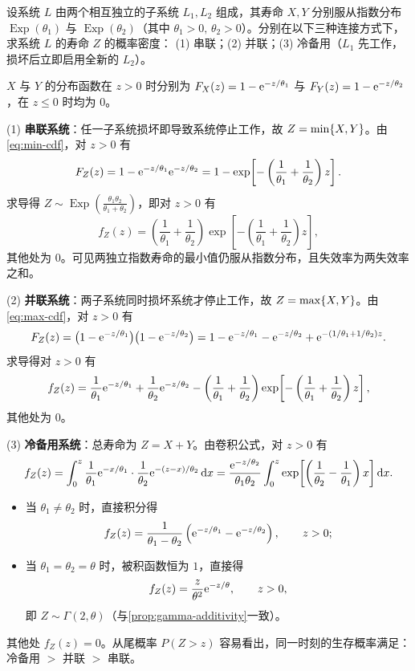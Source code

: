 \begin{example}[title={串联、并联与冷备用三种系统的寿命分布}]
\label{eg:three-lifetime-systems}
设系统 $L$ 由两个相互独立的子系统 $L_1,L_2$ 组成，其寿命 $X,Y$ 分别服从指数分布 $\operatorname{Exp}(\theta_1)$ 与 $\operatorname{Exp}(\theta_2)$（其中 $\theta_1>0,\,\theta_2>0$）。分别在以下三种连接方式下，求系统 $L$ 的寿命 $Z$ 的概率密度：
(1) 串联；(2) 并联；(3) 冷备用（$L_1$ 先工作，损坏后立即启用全新的 $L_2$）。
\begin{solution}
$X$ 与 $Y$ 的分布函数在 $z>0$ 时分别为 $F_X(z)=1-\mathrm{e}^{-z/\theta_1}$ 与 $F_Y(z)=1-\mathrm{e}^{-z/\theta_2}$，在 $z\le 0$ 时均为 $0$。

(1) \textbf{串联系统}：任一子系统损坏即导致系统停止工作，故 $Z=\min\{X,Y\}$。由\eqref{eq:min-cdf}，对 $z>0$ 有
\[
  F_Z(z)=1-\mathrm{e}^{-z/\theta_1}\mathrm{e}^{-z/\theta_2}=1-\exp\!\left[-\left(\frac{1}{\theta_1}+\frac{1}{\theta_2}\right)z\right].
\]
求导得 $Z\sim\operatorname{Exp}\!\left(\frac{\theta_1\theta_2}{\theta_1+\theta_2}\right)$，即对 $z>0$ 有
\[
  f_Z(z)=\left(\frac{1}{\theta_1}+\frac{1}{\theta_2}\right)\exp\!\left[-\left(\frac{1}{\theta_1}+\frac{1}{\theta_2}\right)z\right],
\]
其他处为 $0$。可见两独立指数寿命的最小值仍服从指数分布，且失效率为两失效率之和。

(2) \textbf{并联系统}：两子系统同时损坏系统才停止工作，故 $Z=\max\{X,Y\}$。由\eqref{eq:max-cdf}，对 $z>0$ 有
\[
  F_Z(z)=\bigl(1-\mathrm{e}^{-z/\theta_1}\bigr)\bigl(1-\mathrm{e}^{-z/\theta_2}\bigr)
  =1-\mathrm{e}^{-z/\theta_1}-\mathrm{e}^{-z/\theta_2}+\mathrm{e}^{-(1/\theta_1+1/\theta_2)z}.
\]
求导得对 $z>0$ 有
\[
  f_Z(z)=\frac{1}{\theta_1}\mathrm{e}^{-z/\theta_1}+\frac{1}{\theta_2}\mathrm{e}^{-z/\theta_2}
  -\left(\frac{1}{\theta_1}+\frac{1}{\theta_2}\right)\exp\!\left[-\left(\frac{1}{\theta_1}+\frac{1}{\theta_2}\right)z\right],
\]
其他处为 $0$。

(3) \textbf{冷备用系统}：总寿命为 $Z=X+Y$。由卷积公式，对 $z>0$ 有
\[
  f_Z(z)=\int_{0}^{z}\frac{1}{\theta_1}\mathrm{e}^{-x/\theta_1}\cdot\frac{1}{\theta_2}\mathrm{e}^{-(z-x)/\theta_2}\mathop{}\!\mathrm{d} x
  =\frac{\mathrm{e}^{-z/\theta_2}}{\theta_1\theta_2}\int_{0}^{z}\exp\!\left[\left(\frac{1}{\theta_2}-\frac{1}{\theta_1}\right)x\right]\mathop{}\!\mathrm{d} x.
\]
\begin{itemize}
  \item 当 $\theta_1\ne\theta_2$ 时，直接积分得
  \[
    f_Z(z)=\frac{1}{\theta_1-\theta_2}\left(\mathrm{e}^{-z/\theta_1}-\mathrm{e}^{-z/\theta_2}\right),\qquad z>0;
  \]
  \item 当 $\theta_1=\theta_2=\theta$ 时，被积函数恒为 $1$，直接得
  \[
    f_Z(z)=\frac{z}{\theta^2}\mathrm{e}^{-z/\theta},\qquad z>0,
  \]
  即 $Z\sim\Gamma(2,\theta)$（与\cref{prop:gamma-additivity}一致）。
\end{itemize}
其他处 $f_Z(z)=0$。从尾概率 $P(Z>z)$ 容易看出，同一时刻的生存概率满足：冷备用 $>$ 并联 $>$ 串联。
\end{solution}
\end{example}

